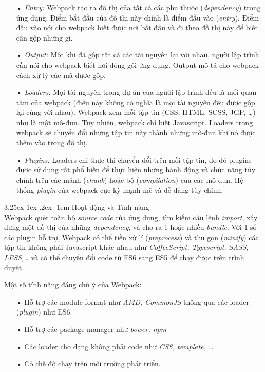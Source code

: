 \documentclass[12pt,a4paper,twoside]{article}
\makeatletter
\newcommand{\myparagraph}[1]{\paragraph{#1}\mbox{}\\} %
\renewcommand\paragraph{\@startsection{paragraph}{5}{\z@}%
  {3.25ex \@plus1ex \@minus.2ex}%
  {-1em}%
  {\normalfont\normalsize\bfseries}}
\makeatother
\begin{document}
\begin{itemize}
\item[•] \emph{Entry:} Webpack tạo ra đồ thị của tất cả các phụ thuộc (\textit{dependency}) trong ứng dụng. Điểm bắt đầu của đồ thị này chính là điểm đầu vào (\textit{entry}). Điểm đầu vào nói cho webpack biết được nơi bắt đầu và đi theo đồ thị này để biết cần gộp những gì.
\item[•] \emph{Output:} Một khi đã gộp tất cả các tài nguyên lại với nhau, người lập trình cần nói cho webpack biết nơi đóng gói ứng dụng. Output mô tả cho webpack cách xử lý các mã được gộp.
\item[•] \emph{Loaders:} Mọi tài nguyên trong dự án của người lập trình đều là mối quan tâm của webpack (điều này không có nghĩa là mọi tài nguyên đều được gộp lại cùng với nhau). Webpack xem mỗi tập tin (CSS, HTML, SCSS, JGP, …) như là một mô-đun. Tuy nhiên, webpack chỉ biết Javascript. Loaders trong webpack sẽ chuyển đổi những tập tin này thành những mô-đun khi nó được thêm vào trong đồ thị.
\item[•] \emph{Plugins:} Loaders chỉ thực thi chuyển đổi trên mỗi tập tin, do đó plugins được sử dụng rất phổ biến để thực hiện những hành động và chức năng tùy chỉnh trên các mảnh (\textit{chunk}) hoặc bộ (\textit{compilation}) của các mô-đun. Hệ thống \textit{plugin} của webpack cực kỳ mạnh mẽ và dễ dàng tùy chỉnh.
\end{itemize}

\myparagraph{Hoạt động và Tính năng}
Webpack quét toàn bộ \textit{source code} của ứng dụng, tìm kiếm câu lệnh \textit{import}, xây dựng một đồ thị của những \textit{dependency}, và cho ra 1 hoặc nhiều \textit{bundle}. Với 1 số các plugin hỗ trợ, Webpack có thể tiền xử lí (\textit{preprocess}) và thu gọn (\textit{minify}) các tập tin không phải Javascript khác nhau như \textit{CoffeeScript, Typescript, SASS, LESS,…} và có thể chuyển đổi code từ ES6 sang ES5 để chạy được trên trình duyệt.

Một số tính năng đáng chú ý của Webpack:
\begin{itemize}
\item[•] Hỗ trợ các module format như \textit{AMD, CommonJS} thông qua các loader (\textit{plugin}) như ES6.
\item[•] Hỗ trợ các package manager như \textit{bower, npm}
\item[•] Các loader cho dạng không phải code như \textit{CSS, template, …}
\item[•] Có chế độ chạy trên môi trường phát triển.
\end{itemize}
\end{document}
